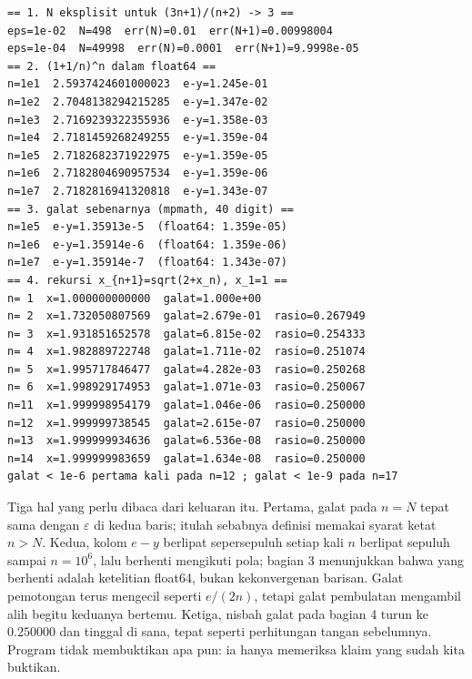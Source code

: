 \begin{verbatim}
== 1. N eksplisit untuk (3n+1)/(n+2) -> 3 ==
eps=1e-02  N=498  err(N)=0.01  err(N+1)=0.00998004
eps=1e-04  N=49998  err(N)=0.0001  err(N+1)=9.9998e-05
== 2. (1+1/n)^n dalam float64 ==
n=1e1  2.5937424601000023  e-y=1.245e-01
n=1e2  2.7048138294215285  e-y=1.347e-02
n=1e3  2.7169239322355936  e-y=1.358e-03
n=1e4  2.7181459268249255  e-y=1.359e-04
n=1e5  2.7182682371922975  e-y=1.359e-05
n=1e6  2.7182804690957534  e-y=1.359e-06
n=1e7  2.7182816941320818  e-y=1.343e-07
== 3. galat sebenarnya (mpmath, 40 digit) ==
n=1e5  e-y=1.35913e-5  (float64: 1.359e-05)
n=1e6  e-y=1.35914e-6  (float64: 1.359e-06)
n=1e7  e-y=1.35914e-7  (float64: 1.343e-07)
== 4. rekursi x_{n+1}=sqrt(2+x_n), x_1=1 ==
n= 1  x=1.000000000000  galat=1.000e+00
n= 2  x=1.732050807569  galat=2.679e-01  rasio=0.267949
n= 3  x=1.931851652578  galat=6.815e-02  rasio=0.254333
n= 4  x=1.982889722748  galat=1.711e-02  rasio=0.251074
n= 5  x=1.995717846477  galat=4.282e-03  rasio=0.250268
n= 6  x=1.998929174953  galat=1.071e-03  rasio=0.250067
n=11  x=1.999998954179  galat=1.046e-06  rasio=0.250000
n=12  x=1.999999738545  galat=2.615e-07  rasio=0.250000
n=13  x=1.999999934636  galat=6.536e-08  rasio=0.250000
n=14  x=1.999999983659  galat=1.634e-08  rasio=0.250000
galat < 1e-6 pertama kali pada n=12 ; galat < 1e-9 pada n=17
\end{verbatim}

Tiga hal yang perlu dibaca dari keluaran itu. Pertama, galat pada $n=N$ tepat sama
dengan $\varepsilon$ di kedua baris; itulah sebabnya definisi memakai syarat ketat
$n>N$. Kedua, kolom $e-y$ berlipat sepersepuluh setiap kali $n$ berlipat sepuluh
sampai $n=10^6$, lalu berhenti mengikuti pola; bagian 3 menunjukkan bahwa yang
berhenti adalah ketelitian float64, bukan kekonvergenan barisan. Galat pemotongan
terus mengecil seperti $e/(2n)$, tetapi galat pembulatan mengambil alih begitu
keduanya bertemu. Ketiga, nisbah galat pada bagian 4 turun ke $0.250000$ dan tinggal
di sana, tepat seperti perhitungan tangan sebelumnya. Program tidak membuktikan apa
pun: ia hanya memeriksa klaim yang sudah kita buktikan.

